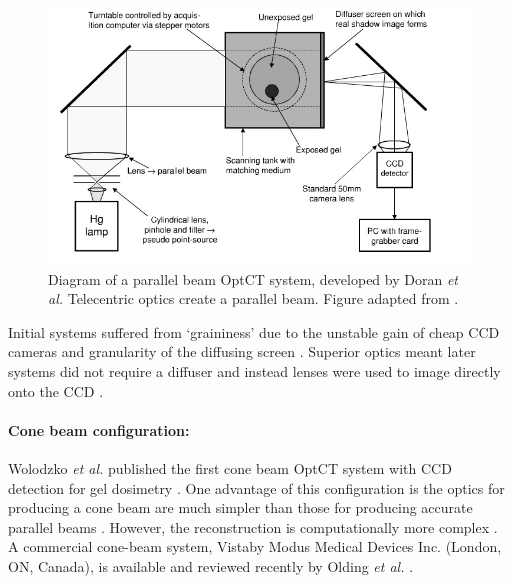\begin{figure}[H]
\centering
\includegraphics[scale=0.55]{Doran_2001_ccdsetup.jpg}
\caption{Diagram of a parallel beam  OptCT system, developed by Doran \textit{et al.} Telecentric optics create a parallel beam.  Figure adapted from \cite{Doran:2001ee}. }
\label{fig:doran_ccd_setup}
\end{figure}



Initial systems  suffered from `graininess' due to the unstable gain of cheap CCD cameras and granularity of the diffusing screen \cite{Doran:2001ee}. Superior optics meant later systems did not require a diffuser and instead lenses were used to image directly onto the CCD \cite{Krstajic:2006kna}.  







\paragraph{Cone beam configuration:}
Wolodzko \textit{et al.} published the first cone beam OptCT system with CCD detection for gel dosimetry \cite{Wolodzko:1999}. One advantage of this configuration is the optics for producing a cone beam are much simpler than those for producing accurate parallel beams \cite{Doran:2008kh}. However, the reconstruction is computationally more complex \cite{hsieh2003computed}. A commercial cone-beam system, Vista\texttrademark by Modus Medical Devices Inc. (London, ON, Canada),  is available and reviewed recently by Olding \textit{et al.} \cite{Olding:2011eta}.



